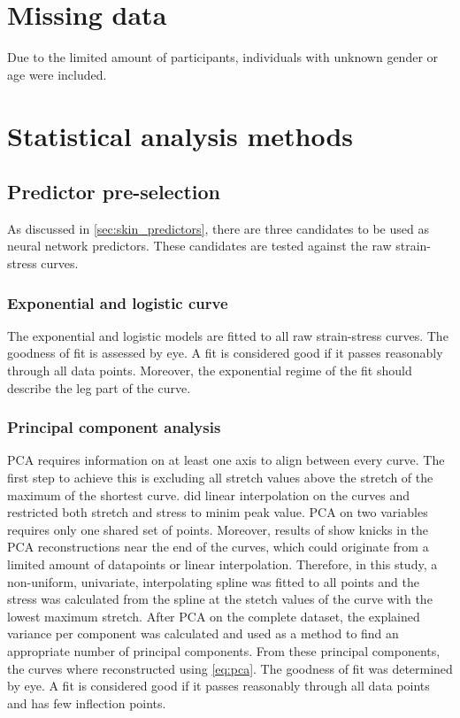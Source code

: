 \section{Missing data}
Due to the limited amount of participants, individuals with unknown gender or age were included.

\section{Statistical analysis methods}

\subsection{Predictor pre-selection}
As discussed in \cref{sec:skin_predictors}, there are three candidates to be used as neural network predictors.
These candidates are tested against the raw strain-stress curves.

\subsubsection{Exponential and logistic curve}
The exponential and logistic models are fitted to all raw strain-stress curves.
The goodness of fit is assessed by eye.
A fit is considered good if it passes reasonably through all data points.
Moreover, the exponential regime of the fit should describe the leg part of the curve.

\subsubsection{Principal component analysis}
PCA requires information on at least one axis to align between every curve.
The first step to achieve this is excluding all stretch values above the stretch of the maximum of the shortest curve.
\textcite{Soylu2022} did linear interpolation on the curves and restricted both stretch and stress to minim peak value.
PCA on two variables requires only one shared set of points.
Moreover, results of \citeauthor{Soylu2022} show knicks in the PCA reconstructions near the end of the curves, which could originate from a limited amount of datapoints or linear interpolation.
Therefore, in this study, a non-uniform, univariate, interpolating spline was fitted to all points and the stress was calculated from the spline at the stetch values of the curve with the lowest maximum stretch.
After PCA on the complete dataset, the explained variance per component was calculated and used as a method to find an appropriate number of principal components.
From these principal components, the curves where reconstructed using \cref{eq:pca}.
The goodness of fit was determined by eye.
A fit is considered good if it passes reasonably through all data points and has few inflection points.

